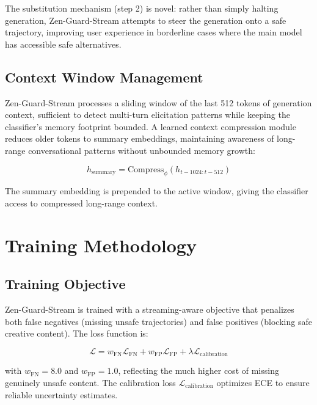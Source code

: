 \documentclass[11pt,a4paper]{article}
\begin{document}
The substitution mechanism (step 2) is novel: rather than simply halting generation, Zen-Guard-Stream attempts to steer the generation onto a safe trajectory, improving user experience in borderline cases where the main model has accessible safe alternatives.

\subsection{Context Window Management}

Zen-Guard-Stream processes a sliding window of the last 512 tokens of generation context, sufficient to detect multi-turn elicitation patterns while keeping the classifier's memory footprint bounded. A learned context compression module reduces older tokens to summary embeddings, maintaining awareness of long-range conversational patterns without unbounded memory growth:

\begin{equation}
  h_{\text{summary}} = \text{Compress}_\phi(h_{t-1024:t-512})
\end{equation}

The summary embedding is prepended to the active window, giving the classifier access to compressed long-range context.

\section{Training Methodology}

\subsection{Training Objective}

Zen-Guard-Stream is trained with a streaming-aware objective that penalizes both false negatives (missing unsafe trajectories) and false positives (blocking safe creative content). The loss function is:

\begin{equation}
  \mathcal{L} = w_{\text{FN}} \mathcal{L}_{\text{FN}} + w_{\text{FP}} \mathcal{L}_{\text{FP}} + \lambda \mathcal{L}_{\text{calibration}}
\end{equation}

with $w_{\text{FN}} = 8.0$ and $w_{\text{FP}} = 1.0$, reflecting the much higher cost of missing genuinely unsafe content. The calibration loss $\mathcal{L}_{\text{calibration}}$ optimizes ECE to ensure reliable uncertainty estimates.
\end{document}
